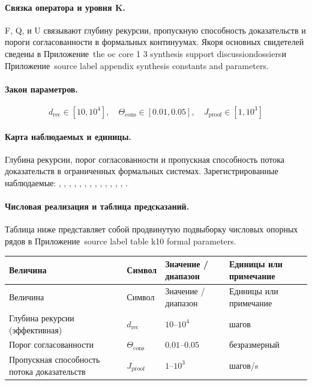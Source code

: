 \paragraph{Связка оператора и уровня K.}
F, Q, и U связывают глубину рекурсии, пропускную способность доказательств и пороги согласованности в формальных континуумах.
Якоря основных свидетелей сведены в Приложение~the oc core 1 3 synthesis support discussiondossiersи Приложение~source label appendix synthesis constants and parameters.

\paragraph{Закон параметров.}
\[
d_{\mathrm{rec}} \in [10,10^4],\quad \Theta_{\mathrm{cons}} \in [0.01,0.05],\quad J_{\mathrm{proof}} \in [1,10^3]
\]

\paragraph{Карта наблюдаемых и единицы.}
Глубина рекурсии, порог согласованности и пропускная способность потока доказательств в ограниченных формальных системах.
Зарегистрированные наблюдаемые: , \allowbreak {}, \allowbreak {}, \allowbreak {}, \allowbreak {}, \allowbreak {}, \allowbreak {}, \allowbreak {}, \allowbreak {}, \allowbreak {}, \allowbreak {}, \allowbreak {}, \allowbreak {}, \allowbreak {}.

\paragraph{Числовая реализация и таблица предсказаний.}
Таблица ниже представляет собой продвинутую подвыборку числовых опорных рядов в Приложение~source label table k10 formal parameters.
\begin{longtable}{@{}L{0.27\textwidth}L{0.15\textwidth}L{0.24\textwidth}L{0.16\textwidth}@{}}
\toprule
Величина & Символ & Значение / диапазон & Единицы или примечание \\
\midrule
\endfirsthead
\toprule
Величина & Символ & Значение / диапазон & Единицы или примечание \\
\midrule
\endhead
Глубина рекурсии (эффективная) & $\scriptstyle d_{\mathrm{rec}}$ & $10\text{--}10^4$ & шагов \\
Порог согласованности & $\scriptstyle \Theta_{\mathrm{cons}}$ & $0.01\text{--}0.05$ & безразмерный \\
Пропускная способность потока доказательств & $\scriptstyle J_{\mathrm{proof}}$ & $1\text{--}10^3$ & шагов/s \\
\bottomrule
\end{longtable}

